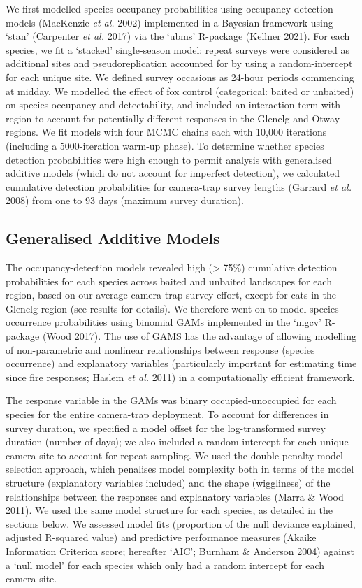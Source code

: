 \documentclass[]{elsarticle} %
\begin{document}
We first modelled species occupancy probabilities using occupancy-detection models (MacKenzie \emph{et al.} 2002) implemented in a Bayesian framework using `stan' (Carpenter \emph{et al.} 2017) via the `ubms' R-package (Kellner 2021). For each species, we fit a `stacked' single-season model: repeat surveys were considered as additional sites and pseudoreplication accounted for by using a random-intercept for each unique site. We defined survey occasions as 24-hour periods commencing at midday. We modelled the effect of fox control (categorical: baited or unbaited) on species occupancy and detectability, and included an interaction term with region to account for potentially different responses in the Glenelg and Otway regions. We fit models with four MCMC chains each with 10,000 iterations (including a 5000-iteration warm-up phase). To determine whether species detection probabilities were high enough to permit analysis with generalised additive models (which do not account for imperfect detection), we calculated cumulative detection probabilities for camera-trap survey lengths (Garrard \emph{et al.} 2008) from one to 93 days (maximum survey duration).

\hypertarget{generalised-additive-models}{%
\subsection{Generalised Additive Models}\label{generalised-additive-models}}

The occupancy-detection models revealed high (\textgreater{} 75\%) cumulative detection probabilities for each species across baited and unbaited landscapes for each region, based on our average camera-trap survey effort, except for cats in the Glenelg region (see results for details). We therefore went on to model species occurrence probabilities using binomial GAMs implemented in the `mgcv' R-package (Wood 2017). The use of GAMS has the advantage of allowing modelling of non-parametric and nonlinear relationships between response (species occurrence) and explanatory variables (particularly important for estimating time since fire responses; Haslem \emph{et al.} 2011) in a computationally efficient framework.

The response variable in the GAMs was binary occupied-unoccupied for each species for the entire camera-trap deployment. To account for differences in survey duration, we specified a model offset for the log-transformed survey duration (number of days); we also included a random intercept for each unique camera-site to account for repeat sampling. We used the double penalty model selection approach, which penalises model complexity both in terms of the model structure (explanatory variables included) and the shape (wiggliness) of the relationships between the responses and explanatory variables (Marra \& Wood 2011). We used the same model structure for each species, as detailed in the sections below. We assessed model fits (proportion of the null deviance explained, adjusted R-squared value) and predictive performance measures (Akaike Information Criterion score; hereafter `AIC'; Burnham \& Anderson 2004) against a `null model' for each species which only had a random intercept for each camera site.
\end{document}
